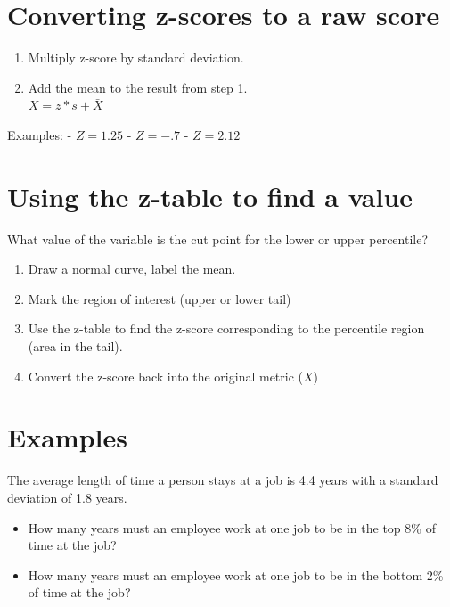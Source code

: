 \documentclass[12pt]{article}
\begin{document}
\section{Converting z-scores to a raw
score}\label{converting-z-scores-to-a-raw-score}

\begin{enumerate}
\def\labelenumi{\arabic{enumi}.}
\itemsep1pt\parskip0pt
\item
  Multiply z-score by standard deviation.
\item
  Add the mean to the result from step 1.\\\(X = z*s + \bar{X}\)
\end{enumerate}

Examples: - \(Z = 1.25\) - \(Z = -.7\) - \(Z = 2.12\)

\section{Using the z-table to find a
value}\label{using-the-z-table-to-find-a-value}

What value of the variable is the cut point for the lower or upper
percentile?

\begin{enumerate}
\def\labelenumi{\arabic{enumi}.}
\itemsep1pt\parskip0pt
\item
  Draw a normal curve, label the mean.
\item
  Mark the region of interest (upper or lower tail)
\item
  Use the z-table to find the z-score corresponding to the percentile
  region (area in the tail).
\item
  Convert the z-score back into the original metric (\(X\))
\end{enumerate}

\section{Examples}\label{examples}

The average length of time a person stays at a job is 4.4 years with a
standard deviation of 1.8 years.

\begin{itemize}
\itemsep1pt\parskip0pt
\item
  How many years must an employee work at one job to be in the top 8\%
  of time at the job?
\item
  How many years must an employee work at one job to be in the bottom
  2\% of time at the job?
\end{itemize}
\end{document}
